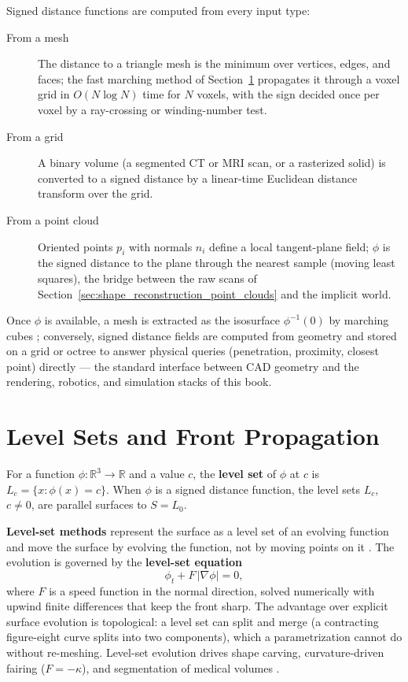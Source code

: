 Signed distance functions are computed from every input type:

\begin{description}
  \item[From a mesh] The distance to a triangle mesh is the minimum over
    vertices, edges, and faces; the fast marching method of
    Section~\ref{sec:shape_level_sets} propagates it through a voxel grid in
    $O(N \log N)$ time for $N$ voxels, with the sign decided once per voxel by
    a ray-crossing or winding-number test.
  \item[From a grid] A binary volume (a segmented CT or MRI scan, or a
    rasterized solid) is converted to a signed distance by a linear-time
    Euclidean distance transform over the grid.
  \item[From a point cloud] Oriented points $p_i$ with normals $n_i$ define a
    local tangent-plane field; $\phi$ is the signed distance to the plane
    through the nearest sample (moving least squares), the bridge between the
    raw scans of Section~\ref{sec:shape_reconstruction_point_clouds} and the
    implicit world.
\end{description}

Once $\phi$ is available, a mesh is extracted as the isosurface $\phi^{-1}(0)$
by marching cubes \cite{lorensen1987}; conversely, signed distance fields are
computed from geometry and stored on a grid or octree to answer physical
queries (penetration, proximity, closest point) directly --- the standard
interface between CAD geometry and the rendering, robotics, and simulation
stacks of this book.

\section{Level Sets and Front Propagation}
\label{sec:shape_level_sets}

\begin{definition}\label{def:shape_level_set}
  For a function $\phi \colon \mathbb{R}^3 \to \mathbb{R}$ and a value $c$, the
  \textbf{level set} of $\phi$ at $c$ is $L_c = \{ x : \phi(x) = c \}$. When
  $\phi$ is a signed distance function, the level sets $L_c$, $c \ne 0$, are
  parallel surfaces to $S = L_0$.
\end{definition}

\textbf{Level-set methods} represent the surface as a level set
of an evolving function and move the surface by evolving the function, not by
moving points on it \cite{osher2003}. The evolution is governed by the
\textbf{level-set equation}
\[
\phi_t + F\,|\nabla \phi| = 0,
\]
where $F$ is a speed function in the normal direction, solved numerically with
upwind finite differences that keep the front sharp. The advantage over
explicit surface evolution is topological: a level set can split and merge (a
contracting figure-eight curve splits into two components), which a
parametrization cannot do without re-meshing. Level-set evolution drives shape
carving, curvature-driven fairing ($F = -\kappa$), and segmentation of medical
volumes \cite{osher2003,sethian1996}.


